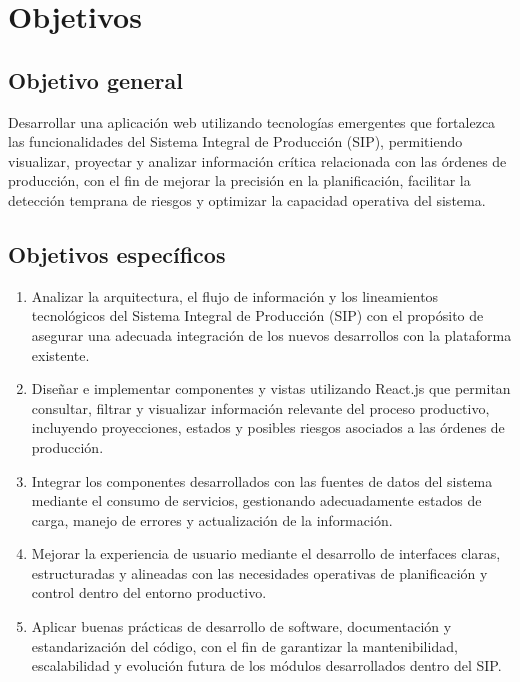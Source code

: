\section{Objetivos}

\subsection{Objetivo general}

Desarrollar una aplicación web utilizando tecnologías emergentes que fortalezca las funcionalidades del Sistema Integral de Producción (SIP), permitiendo visualizar, proyectar y analizar información crítica relacionada con las órdenes de producción, con el fin de mejorar la precisión en la planificación, facilitar la detección temprana de riesgos y optimizar la capacidad operativa del sistema.

\subsection{Objetivos específicos}

\begin{enumerate}
    \item Analizar la arquitectura, el flujo de información y los lineamientos tecnológicos del Sistema Integral de Producción (SIP) con el propósito de asegurar una adecuada integración de los nuevos desarrollos con la plataforma existente.

    \item Diseñar e implementar componentes y vistas utilizando React.js que permitan consultar, filtrar y visualizar información relevante del proceso productivo, incluyendo proyecciones, estados y posibles riesgos asociados a las órdenes de producción.

    \item Integrar los componentes desarrollados con las fuentes de datos del sistema mediante el consumo de servicios, gestionando adecuadamente estados de carga, manejo de errores y actualización de la información.

    \item Mejorar la experiencia de usuario mediante el desarrollo de interfaces claras, estructuradas y alineadas con las necesidades operativas de planificación y control dentro del entorno productivo.

    \item Aplicar buenas prácticas de desarrollo de software, documentación y estandarización del código, con el fin de garantizar la mantenibilidad, escalabilidad y evolución futura de los módulos desarrollados dentro del SIP.
\end{enumerate}